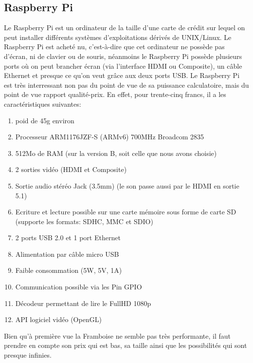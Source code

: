 \documentclass[a4paper,12pt]{article}
\begin{document}
{\subsection*{Raspberry Pi}
Le Raspberry Pi est un ordinateur de la taille d'une carte de crédit sur lequel on peut installer différents systèmes d'exploitations dérivés de UNIX/Linux. Le Raspberry Pi est acheté nu, c'est-à-dire que cet ordinateur ne possède pas d'écran, ni de clavier ou de souris, néanmoins le Raspberry Pi possède plusieurs ports où on peut brancher écran (via l'interface HDMI ou Composite), un câble Ethernet et presque ce qu'on veut grâce aux deux ports USB. Le Raspberry Pi est très interressant non pas du point de vue de sa puissance calculatoire, mais du point de vue rapport qualité-prix. En effet, pour trente-cinq francs, il a les caractéristiques suivantes: 
\begin{enumerate}
\item poid de 45g environ
\item Processeur ARM1176JZF-S (ARMv6) 700MHz Broadcom 2835
\item 512Mo de RAM (sur la version B, soit celle que nous avons choisie)
\item 2 sorties vidéo (HDMI et Composite) 
\item Sortie audio stéréo Jack (3.5mm) (le son passe aussi par le HDMI en sortie 5.1)
\item Ecriture et lecture possible sur une carte mémoire sous forme de carte SD (supporte les formats: SDHC, MMC et SDIO)
\item 2 ports USB 2.0 et 1 port Ethernet
\item Alimentation par câble micro USB
\item Faible consommation (5W, 5V, 1A)
\item Communication possible via les Pin GPIO
\item Décodeur permettant de lire le FullHD  1080p
\item API logiciel vidéo (OpenGL)
\end{enumerate}
Bien qu'à première vue la Framboise ne semble pas très performante, il faut prendre en compte son prix qui est bas, sa taille ainsi que les possibilités qui sont presque infinies.

}
\end{document}
